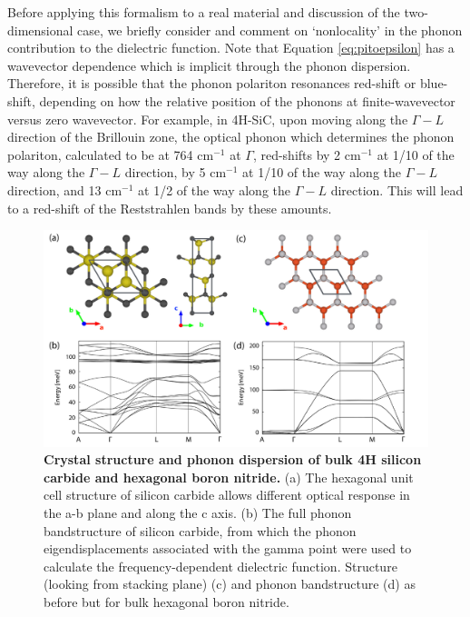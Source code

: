 \documentclass[aps,prb,twocolumn,
	groupedaddress,superscriptaddress,
	amsfonts,amssymb,amsmath,floatfix,
	citeautoscript]{revtex4-1}
\begin{document}
Before applying this formalism to a real material and discussion of the two-dimensional case, we briefly consider and comment on `nonlocality' in the phonon contribution to the dielectric function. Note that Equation \ref{eq:pitoepsilon} has a wavevector dependence which is implicit through the phonon dispersion.  Therefore, it is possible that the phonon polariton resonances red-shift or blue-shift, depending on how the relative position of the phonons at finite-wavevector versus zero wavevector. For example, in 4H-SiC, upon moving along the $\Gamma-L$ direction of the Brillouin zone, the optical phonon which determines the phonon polariton, calculated to be at 764 cm$^{-1}$ at $\Gamma$, red-shifts by 2  cm$^{-1}$ at 1/10 of the way along the $\Gamma-L$ direction, by 5 cm$^{-1}$ at 1/10 of the way along the $\Gamma-L$ direction, and 13 cm$^{-1}$ at 1/2 of the way along the $\Gamma-L$ direction. This will lead to a red-shift of the Reststrahlen bands by these amounts.
\begin{figure}[t]
\includegraphics[width=16cm]{combined_structure.pdf}
\caption{\textbf{Crystal structure and phonon dispersion of bulk 4H silicon carbide and hexagonal boron nitride.} (a) The hexagonal unit cell structure of silicon carbide allows different optical response in the a-b plane and along the c axis. (b) The full phonon bandstructure of silicon carbide, from which the phonon eigendisplacements associated with the gamma point were used to calculate the frequency-dependent dielectric function. Structure (looking from stacking plane) (c) and phonon bandstructure (d) as before but for bulk hexagonal boron nitride.}
\label{fig:phonons}
\end{figure}
\end{document}
